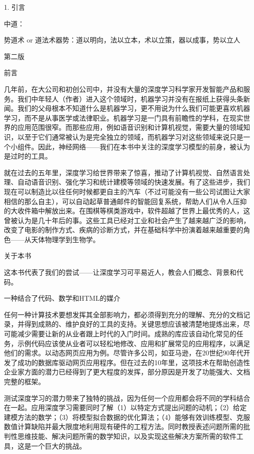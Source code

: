 1. 引言

中道：



势道术 or 道法术器势：道以明向，法以立本，术以立策，器以成事，势以立人





第二版

 前言

几年前，在大公司和初创公司中，并没有大量的深度学习科学家开发智能产品和服务。我们中年轻人（作者）进入这个领域时，机器学习并没有在报纸上获得头条新闻。我们的父母根本不知道什么是机器学习，更不用说为什么我们可能更喜欢机器学习，而不是从事医学或法律职业。机器学习是一门具有前瞻性的学科，在现实世界的应用范围很窄。而那些应用，例如语音识别和计算机视觉，需要大量的领域知识，以至于它们通常被认为是完全独立的领域，而机器学习对这些领域来说只是一个小组件。因此，神经网络——我们在本书中关注的深度学习模型的前身，被认为是过时的工具。

就在过去的五年里，深度学习给世界带来了惊喜，推动了计算机视觉、自然语言处理、自动语音识别、强化学习和统计建模等领域的快速发展。有了这些进步，我们现在可以制造比以往任何时候都更自主的汽车（不过可能没有一些公司试图让大家相信的那么自主），可以自动起草普通邮件的智能回复系统，帮助人们从令人压抑的大收件箱中解放出来。在围棋等棋类游戏中，软件超越了世界上最优秀的人，这曾被认为是几十年后的事。这些工具已经对工业和社会产生了越来越广泛的影响，改变了电影的制作方式、疾病的诊断方式，并在基础科学中扮演着越来越重要的角色——从天体物理学到生物学。

 关于本书

这本书代表了我们的尝试——让深度学习可平易近人，教会人们概念、背景和代码。

 一种结合了代码、数学和HTML的媒介

任何一种计算技术要想发挥其全部影响力，都必须得到充分的理解、充分的文档记录，并得到成熟的、维护良好的工具的支持。关键思想应该被清楚地提炼出来，尽可能减少需要让新的从业者跟上时代的入门时间。成熟的库应该自动化常见的任务，示例代码应该使从业者可以轻松地修改、应用和扩展常见的应用程序，以满足他们的需求。以动态网页应用为例。尽管许多公司，如亚马逊，在20世纪90年代开发了成功的数据库驱动网页应用程序。但在过去的10年里，这项技术在帮助创造性企业家方面的潜力已经得到了更大程度的发挥，部分原因是开发了功能强大、文档完整的框架。

测试深度学习的潜力带来了独特的挑战，因为任何一个应用都会将不同的学科结合在一起。应用深度学习需要同时了解（1）以特定方式提出问题的动机；（2）给定建模方法的数学；（3）将模型拟合数据的优化算法；（4）能够有效训练模型、克服数值计算缺陷并最大限度地利用现有硬件的工程方法。同时教授表述问题所需的批判性思维技能、解决问题所需的数学知识，以及实现这些解决方案所需的软件工具，这是一个巨大的挑战。

